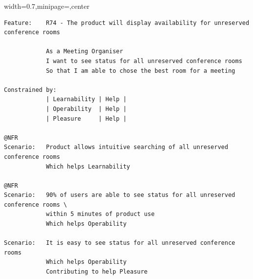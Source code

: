 \documentclass[dissertation,final]{softeng}
\newenvironment{featurecode}[1]
{ \lrbox\featurebox \begin{adjustbox}{width=#1\textwidth,minipage=\textwidth,center} }
{ \end{adjustbox}\endlrbox}
\newenvironment{featurelist}[2]
{
\newcommand{\setcaption}{\caption{#1}}
\newcommand{\setlabel}{\label{#2}}
}
{\begin{listing}[h!]\centering\usebox\featurebox\setcaption\setlabel\end{listing}}
\begin{document}
\begin{appendices}
\begin{featurelist}{R74 -- The product will display availability for unreserved conference rooms}{lst:feature_r74}
\begin{featurecode}{0.7}
\begin{verbatim}
Feature:    R74 - The product will display availability for unreserved conference rooms

            As a Meeting Organiser
            I want to see status for all unreserved conference rooms
            So that I am able to chose the best room for a meeting
	
Constrained by:
            | Learnability | Help |
            | Operability  | Help |
            | Pleasure     | Help |			

@NFR	
Scenario:   Product allows intuitive searching of all unreserved conference rooms
            Which helps Learnability

@NFR	
Scenario:   90% of users are able to see status for all unreserved conference rooms \
            within 5 minutes of product use
            Which helps Operability
	
Scenario:   It is easy to see status for all unreserved conference rooms
            Which helps Operability
            Contributing to help Pleasure
\end{verbatim}
\end{featurecode}
\end{featurelist}

\end{appendices}

\end{document}
